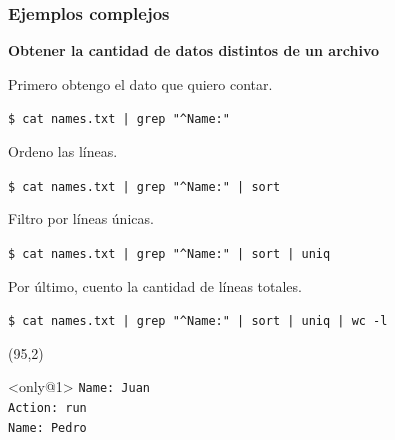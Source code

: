 \documentclass{beamer}
\begin{document}
\begin{frame}[fragile,t]
    \frametitle{\small Ejemplos complejos}
    \textbf{Obtener la cantidad de datos distintos de un archivo}
    \begin{minipage}{0.7\textwidth}
    \vspace{0.6cm}
    \small \pause
    Primero obtengo el dato que quiero contar.
    \vspace{-0.3cm} \scriptsize
    \begin{block}{\vspace*{-3ex}}
    \texttt{\$}\verb; cat names.txt | grep "^Name:";
    \vspace*{0.5ex}
    \end{block}
    \vspace{0.4cm}
    \small \pause
    Ordeno las líneas.
    \vspace{-0.3cm} \scriptsize
    \begin{block}{\vspace*{-3ex}}
    \texttt{\$}\verb; cat names.txt | grep "^Name:" | sort;
    \vspace*{0.5ex}
    \end{block}
    \vspace{0.4cm}
    \small \pause
    Filtro por líneas únicas.
    \vspace{-0.3cm} \scriptsize
    \begin{block}{\vspace*{-3ex}}
    \texttt{\$}\verb; cat names.txt | grep "^Name:" | sort | uniq;
    \vspace*{0.5ex}
    \end{block}
    \vspace{0.4cm}
    \small \pause
    Por último, cuento la cantidad de líneas totales.
    \vspace{-0.3cm} \scriptsize
    \begin{block}{\vspace*{-3ex}}
    \texttt{\$}\verb; cat names.txt | grep "^Name:" | sort | uniq | wc -l; 
    \vspace*{0.5ex}
    \end{block}
    \end{minipage}
    \begin{textblock}{25}(95,2)
    \begin{block}<only@1>{\vspace*{-3ex}}
    \scriptsize
    \verb;Name: Juan;\\
    \verb;Action: run;\\
    \verb;Name: Pedro;\\

\end{block}
\end{textblock}
\end{frame}
\end{document}
